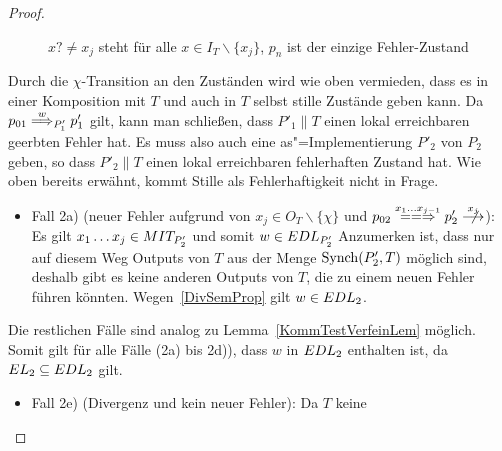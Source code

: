 \begin{proof}
\begin{itemize}
\begin{figure} [h!tbp]
\begin{center}
        \caption{$x?\neq x_j$ steht für alle $x\in I_T\backslash\{x_j\}$, $p_n$
          ist der einzige Fehler-Zustand}
      \label{TmitEundO}
      \end{center}
      \end{figure}
      Durch die $\chi$-Transition an den Zuständen wird wie oben vermieden,
      dass es in einer Komposition mit $T$ und auch in $T$ selbst
      stille Zustände geben kann. Da $p_{01} \weakmust[w]_{P'_1} p'_1$ gilt,
      kann man schließen, dass $P'_1\|T$ einen lokal erreichbaren geerbten
      Fehler hat. Es muss also auch eine as"=Implementierung $P'_2$ von $P_2$
      geben, so dass $P'_2\|T$ einen lokal erreichbaren fehlerhaften Zustand
      hat. Wie oben bereits erwähnt, kommt Stille als Fehlerhaftigkeit nicht in
      Frage.
      \begin{itemize}
        \item Fall 2a) \big(neuer Fehler aufgrund von $x_j\in O_T\backslash
          \{\chi\}$ und $p_{02} \lweakmay[x_1\dots x_{j-1}] p'_2
          \nmust[x_j]$\big): Es gilt $x_1\dots x_j\in MIT _{P'_2}$ und somit
          $w\in EDL _{P'_2}$ Anzumerken ist, dass nur auf diesem Weg Outputs
          von $T$ aus der Menge $\mathrm{Synch} (P'_2,T)$ möglich sind, deshalb gibt es
          keine anderen Outputs von $T$, die zu einem neuen Fehler führen
          könnten. Wegen~\ref{DivSemProp} gilt $w\in EDL _2$.
      \end{itemize}
      Die restlichen Fälle sind analog zu Lemma~\ref{KommTestVerfeinLem}
      möglich. Somit gilt für alle Fälle (2a) bis 2d)), dass $w$ in $EDL _2$
      enthalten ist, da $EL _2\subseteq EDL _2$ gilt.
      \begin{itemize}
        \item Fall 2e) (Divergenz und kein neuer Fehler): Da $T$ keine

\end{itemize}
\end{itemize}
\end{proof}
